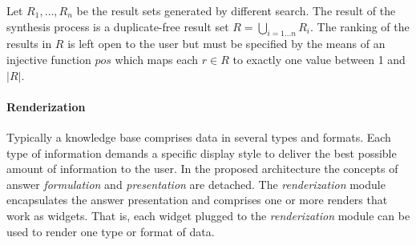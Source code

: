 \vspace{-5mm}
\begin{definition}[Synthesis]
\vspace{-2.0mm}
\label{def:synthesis}
Let $R_1, \ldots, R_n$ be the result sets generated by different search. 
The result of the synthesis process is a duplicate-free result set $R=\bigcup\limits_{i=1 \ldots n} R_i$. %
The ranking of the results in $R$ is left open to the user but must be specified by the means of an injective function $pos$ which maps each $r \in R$ to exactly one value between 1 and $|R|$.
 
\vspace{-5.0mm}
\end{definition}

\vspace{-3.0mm}
\paragraph{\textbf{Renderization}}
Typically a knowledge base comprises data in several types and formats.
Each type of information demands a specific display style to deliver the best possible amount of information to the user.
In the proposed architecture the concepts of answer \emph{formulation} and \emph{presentation} are detached.
The \emph{renderization} module encapsulates the answer presentation and comprises one or more renders that work as widgets.
That is, each widget plugged to the \emph{renderization} module can be used to render one type or format of data.
\vspace{-4mm}


